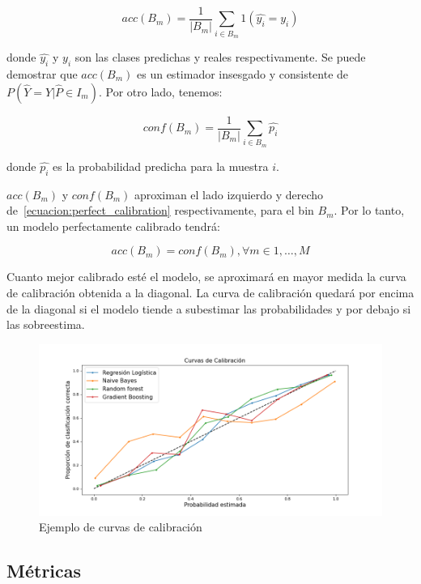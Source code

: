 \begin{equation}\label{ecuacion:acc_bm}
    acc(B_m)=\frac{1}{|B_m|}\sum _{i \in B_m}1(\hat{y_i}=y_i)
\end{equation}

donde $\hat{y_i}$ y $y_i$ son las clases predichas y reales respectivamente. Se
puede demostrar que $acc(B_m)$ es un estimador insesgado y consistente de
$P(\hat{Y}=Y|\hat{P}\in I_m)$. Por otro lado, tenemos:

\begin{equation}\label{ecuacion:conf_bm}
    conf(B_m)=\frac{1}{|B_m|}\sum _{i \in B_m}\hat{p_i}
\end{equation}

donde $\hat{p_i}$ es la probabilidad predicha para la muestra $i$.

    $acc(B_m)$ y $conf(B_m)$ aproximan el lado izquierdo y derecho
de~\ref{ecuacion:perfect_calibration} respectivamente, para el bin $B_m$. Por lo
tanto, un modelo perfectamente calibrado tendrá:

\begin{equation}\label{ecuacion:acc_conf_bm}
    acc(B_m)=conf(B_m), \forall m \in {1,\dots,M}
\end{equation}

Cuanto mejor calibrado esté el modelo, se aproximará en mayor medida la curva de
calibración obtenida a la diagonal. La curva de calibración quedará por encima
de la diagonal si el modelo tiende a subestimar las probabilidades y por debajo
si las sobreestima.

\begin{figure}[H]
    \centerline{\includegraphics[width=\textwidth]{../plots_teoria/curvas_de_calibracion.png}}
    \caption{Ejemplo de curvas de calibración}\label{fig:curvas_de_calibracion}
\end{figure}

\subsection{Métricas}

